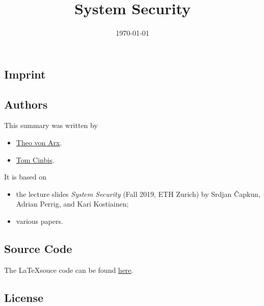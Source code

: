 \documentclass[a4paper, fontsize=8pt, landscape]{scrartcl}
\title{System Security}
\date{\today}
\begin{document}
\setcounter{secnumdepth}{2} %
\begin{multicols*}{3}
	\maketitle

	\section*{Imprint}
	\subsection*{Authors}
	This summary was written by
	\begin{itemize}
		\item \href{mailto:varxth@student.ethz.ch}{Theo von Arx}.
		\item \href{mailto:tom.cinbis@student.ethz.ch}{Tom Cinbis}.
	\end{itemize}
	It is based on
	\begin{itemize}
	  \item the lecture slides \textit{System Security} (Fall
	    2019, ETH Zurich) by Srdjan Čapkun,
	    Adrian Perrig, and Kari Kostiainen;
	  \item various papers.
	\end{itemize}
	\subsection*{Source Code}
	The \LaTeX souce code can be found
	\href{https://gitlab.ethz.ch/varxth/summary-syssec-2019}{here}.
	\subsection*{License}
	\doclicenseLongText
	\begin{center}\doclicenseImage[imagewidth=0.5\columnwidth]\end{center}

	\bigskip

	
	
	
	
	
	
	
	
	
	
	
	
	
\end{multicols*}

	\appendix
	
\setcounter{secnumdepth}{2}
\end{document}
